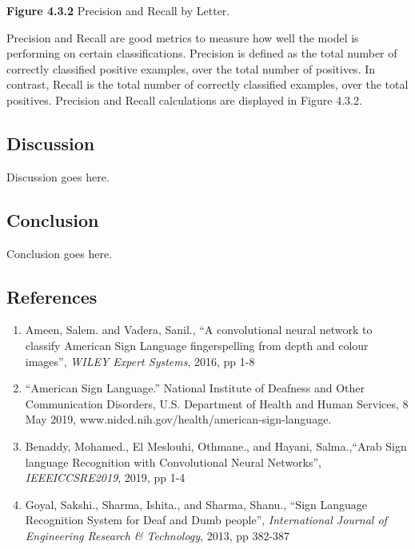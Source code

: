 \documentclass[11pt]{article}
\begin{document}
\begin{multicols}{2}
\begin{center}
\textbf{Figure 4.3.2} Precision and Recall by Letter.
\end{center}
\par
Precision and Recall are good metrics to measure how well the model is performing on certain classifications.  Precision is defined as the total number of correctly classified positive examples, over the total number of positives.  In contrast, Recall is the total number of correctly classified examples, over the total positives.  Precision and Recall calculations are displayed in Figure 4.3.2.


\subsection*{Discussion}

Discussion goes here.

\subsection*{Conclusion}

Conclusion goes here.

\subsection*{References}
\begin{enumerate}
\item[\textbf{[1]}] Ameen, Salem. and Vadera,  Sanil., \enquote{A convolutional neural network to classify American Sign Language fingerspelling from depth and colour images}, \textit{WILEY Expert Systems}, 2016, pp 1-8
\item[\textbf{[2]}] \enquote{American Sign Language.} National Institute of Deafness and Other Communication Disorders, U.S. Department of Health and Human Services, 8 May 2019, www.nidcd.nih.gov/health/american-sign-language.
\item[\textbf{[3]}] Benaddy, Mohamed., El Meslouhi, Othmane., and Hayani, Salma.,\enquote{Arab Sign language Recognition with Convolutional Neural Networks}, \textit{IEEEICCSRE2019}, 2019, pp 1-4
\item[\textbf{[4]}] Goyal, Sakshi., Sharma, Ishita., and Sharma, Shanu., \enquote{Sign Language Recognition System for Deaf and Dumb people}, \textit{International Journal of Engineering Research \& Technology}, 2013, pp 382-387


\end{enumerate}


\end{multicols}
\end{document}
